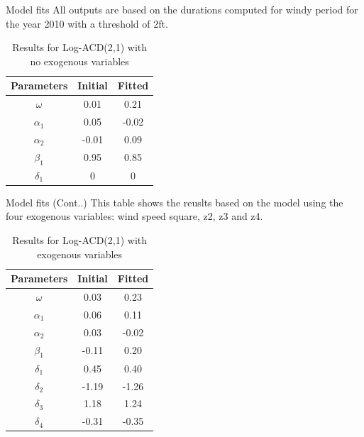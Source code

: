 \documentclass[
  ignorenonframetext,
]{beamer}
\begin{document}
\begin{frame}{Model fits}
\protect\hypertarget{model-fits}{}
All outputs are based on the durations computed for windy period for the
year 2010 with a threshold of 2ft.

\begin{table}[ht]
\caption{Results for Log-ACD(2,1) with no exogenous variables}
\begin{tabular}{|c|c|c|}
 \hline
 Parameters & Initial & Fitted \\
 \hline
 $\omega$   & 0.01 & 0.21 \\
 $\alpha_1$    & 0.05 & -0.02 \\
 $\alpha_2$   & -0.01 & 0.09 \\
 $\beta_1$    & 0.95 & 0.85 \\
 $\delta_1$   & 0  & 0 \\
 \hline
\end{tabular}
\end{table}
\end{frame}

\begin{frame}{Model fits (Cont..)}
\protect\hypertarget{model-fits-cont..}{}
This table shows the reuslts based on the model using the four exogenous
variables: wind speed square, z2, z3 and z4.

\begin{table}[ht]
\caption{Results for Log-ACD(2,1) with exogenous variables}
\begin{tabular}{|c|c|c|}
 \hline
 Parameters& Initial & Fitted  \\
 \hline
 $\omega$   & 0.03 & 0.23 \\
 $\alpha_1$   & 0.06 & 0.11 \\
 $\alpha_2$   & 0.03 & -0.02 \\
 $\beta_1$   & -0.11 & 0.20 \\
 $\delta_1$   & 0.45 & 0.40  \\
 $\delta_2$   & -1.19 & -1.26  \\
 $\delta_3$   & 1.18 & 1.24  \\
 $\delta_4$   & -0.31 & -0.35  \\
 \hline
\end{tabular}
\end{table}
\end{frame}
\end{document}
